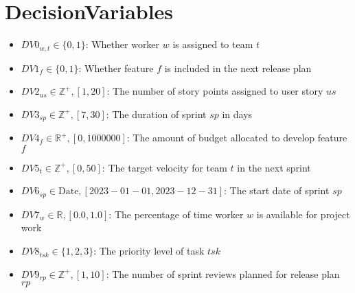 \documentclass{article}
\begin{document}
\section{DecisionVariables}
\begin{itemize}
    \item $DV0_{w,t} \in \{0, 1\}$: Whether worker $w$ is assigned to team $t$
    \item $DV1_f \in \{0, 1\}$: Whether feature $f$ is included in the next release plan
    \item $DV2_{us} \in \mathbb{Z}^{+}, [1, 20]$: The number of story points assigned to user story $us$
    \item $DV3_{sp} \in \mathbb{Z}^{+}, [7, 30]$: The duration of sprint $sp$ in days
    \item $DV4_f \in \mathbb{R}^{+}, [0, 1000000]$: The amount of budget allocated to develop feature $f$
    \item $DV5_t \in \mathbb{Z}^{+}, [0, 50]$: The target velocity for team $t$ in the next sprint
    \item $DV6_{sp} \in \text{Date}, [2023-01-01, 2023-12-31]$: The start date of sprint $sp$
    \item $DV7_w \in \mathbb{R}, [0.0, 1.0]$: The percentage of time worker $w$ is available for project work
    \item $DV8_{tsk} \in \{1, 2, 3\}$: The priority level of task $tsk$
    \item $DV9_{rp} \in \mathbb{Z}^{+}, [1, 10]$: The number of sprint reviews planned for release plan $rp$
\end{itemize}
\end{document}
